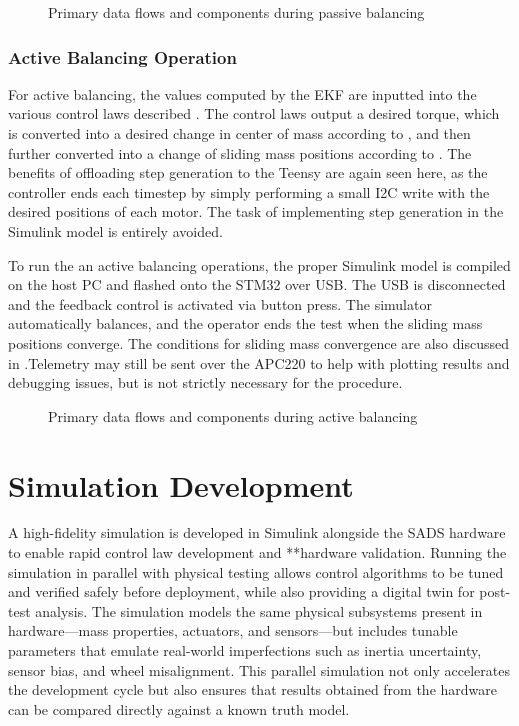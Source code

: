 \begin{figure}
    \centering
    
    \caption{Primary data flows and components during passive balancing}
    \label{fig:sys_arch_passive}
\end{figure}

\subsubsection{Active Balancing Operation}

For active balancing, the values computed by the EKF are inputted into the various control laws described . The control laws output a desired torque, which is converted into a desired change in center of mass according to , and then further converted into a change of sliding mass positions according to . The benefits of offloading step generation to the Teensy are again seen here, as the controller ends each timestep by simply performing a small I2C write with the desired positions of each motor. The task of implementing step generation in the Simulink model is entirely avoided. 

To run the an active balancing operations, the proper Simulink model is compiled on the host PC and flashed onto the STM32 over USB. The USB is disconnected and the feedback control is activated via button press. The simulator automatically balances, and the operator ends the test when the sliding mass positions converge. The conditions for sliding mass convergence are also discussed in .Telemetry may still be sent over the APC220 to help with plotting results and debugging issues, but is not strictly necessary for the procedure. 


\begin{figure}
    \centering
    
    \caption{Primary data flows and components during active balancing}
    \label{fig:sys_arch_active}
\end{figure}

\section{Simulation Development}\label{sec:sim_setup}

A high-fidelity simulation is developed in Simulink alongside the SADS hardware to enable rapid control law development and **hardware validation. Running the simulation in parallel with physical testing allows control algorithms to be tuned and verified safely before deployment, while also providing a digital twin for post-test analysis. The simulation models the same physical subsystems present in hardware—mass properties, actuators, and sensors—but includes tunable parameters that emulate real-world imperfections such as inertia uncertainty, sensor bias, and wheel misalignment. This parallel simulation not only accelerates the development cycle but also ensures that results obtained from the hardware can be compared directly against a known truth model.

